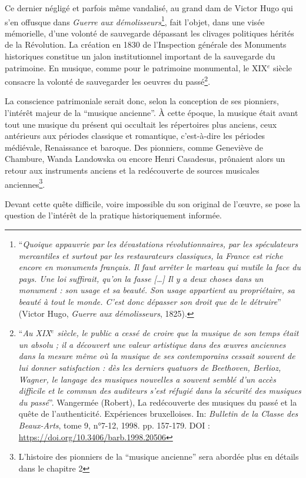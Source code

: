 \smallskip\indent Ce dernier négligé et parfois même vandalisé, au grand dam de Victor Hugo qui s’en offusque dans \textit{Guerre aux démolisseurs}\footnote{\enquote{\textit{Quoique appauvrie par les dévastations révolutionnaires, par les spéculateurs mercantiles et surtout par les restaurateurs classiques, la France est riche encore en monuments français. Il faut arrêter le marteau qui mutile la face du pays. Une loi suffirait, qu’on la fasse […] Il y a deux choses dans un monument : son usage et sa beauté. Son usage appartient au propriétaire, sa beauté à tout le monde. C’est donc dépasser son droit que de le détruire}} (Victor Hugo, \textit{Guerre aux démolisseurs}, 1825).}, fait l’objet, dans une visée mémorielle, d’une volonté de sauvegarde dépassant les clivages politiques hérités de la Révolution. La création en 1830 de l’Inspection générale des Monuments historiques constitue un jalon institutionnel important de la sauvegarde du patrimoine.
En musique, comme pour le patrimoine monumental, le XIX$^{e}$ siècle consacre la volonté de sauvegarder les oeuvres du passé\footnote{\enquote{\textit{Au XIX$^{e}$ siècle, le public a cessé de croire que la musique de son temps était un absolu ; il a découvert une valeur artistique dans des œuvres anciennes dans la mesure même où la musique de ses contemporains cessait souvent de lui donner satisfaction : dès les derniers quatuors de Beethoven, Berlioz, Wagner, le langage des musiques nouvelles a souvent semblé d'un accès difficile et le commun des auditeurs s'est réfugié dans la sécurité des musiques du passé}}. Wangermée (Robert), La redécouverte des musiques du passé et la quête de l'authenticité. Expériences bruxelloises. In: \textit{Bulletin de la Classe des Beaux-Arts}, tome 9, n°7-12, 1998. pp. 157-179. DOI : \url{https://doi.org/10.3406/barb.1998.20506}}.

\smallskip\indent La conscience patrimoniale serait donc, selon la conception de ses pionniers, l’intérêt majeur de la \enquote{musique ancienne}. À cette époque, la musique était avant tout une musique du présent qui occultait les répertoires plus anciens, ceux antérieurs aux périodes classique et romantique, c’est-à-dire les périodes médiévale, Renaissance et baroque. Des pionniers, comme Geneviève de Chambure, Wanda Landowska ou encore Henri Casadesus, prônaient alors un retour aux instruments anciens et la redécouverte de sources musicales anciennes\footnote{L'histoire des pionniers de la \enquote{musique ancienne} sera abordée plus en détails dans le chapitre 2 }.

\bigskip Devant cette quête difficile, voire impossible du son original de l'œuvre, se pose la question de l’intérêt de la pratique historiquement informée.


